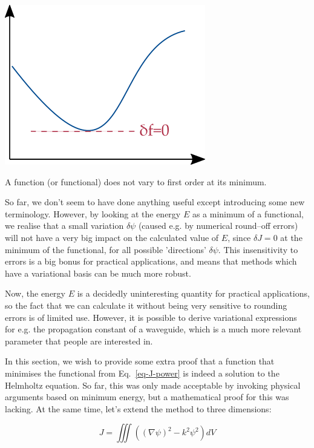 \begin{marginfigure}[1.5cm]
  \includegraphics{numeric/figures/minimum}
  \caption{A function (or functional) does not vary to first order at its minimum.}
  \label{fig-functional-min}
\end{marginfigure}

So far, we don't seem to have done anything useful except introducing some new terminology. However, by looking at the energy $E$ as a minimum of a functional, we realise that a small variation $\delta \psi$ (caused e.g. by numerical round--off errors) will not have a very big impact on the calculated value of $E$, since $\delta J=0$ at the minimum of the functional, for all possible 'directions' $\delta \psi$. This insensitivity to errors is a big bonus for practical applications, and means that methods which have a variational basis can be much more robust.

Now, the energy $E$ is a decidedly uninteresting quantity for practical applications, so the fact that we can calculate it without being very sensitive to rounding errors is of limited use. However, it is possible to derive variational expressions for e.g. the propagation constant of a waveguide, which is a much more relevant parameter that people are interested in.

\pagebreak



In this section, we wish to provide some extra proof that a function that minimises the functional from Eq.~\ref{eq-J-power} is indeed a solution to the Helmholtz equation. So far, this was only made acceptable by invoking physical arguments based on minimum energy, but a mathematical proof for this was lacking. At the same time, let's extend the method to three dimensions:

\begin{equation}
J = \iiint \left((\nabla \psi)^2 - k^2 \psi^2 \right) dV \label{eq-variational1}
\end{equation} 

